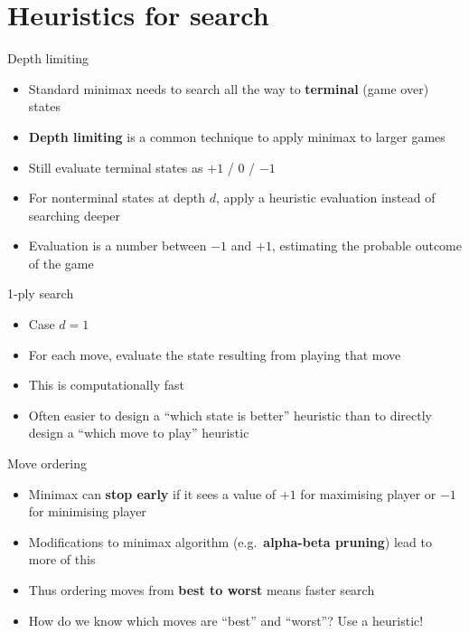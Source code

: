 \part{Heuristics for search}
\frame{\partpage}

\begin{frame}{Depth limiting}
	\begin{itemize}
		\pause\item Standard minimax needs to search all the way to \textbf{terminal} (game over) states
		\pause\item \textbf{Depth limiting} is a common technique to apply minimax to larger games
		\pause\item Still evaluate terminal states as $+1$ / $0$ / $-1$
		\pause\item For nonterminal states at depth $d$, apply a heuristic evaluation instead of searching deeper
		\pause\item Evaluation is a number between $-1$ and $+1$, estimating the probable outcome of the game
	\end{itemize}
\end{frame}

\begin{frame}{1-ply search}
	\begin{itemize}
		\pause\item Case $d=1$
		\pause\item For each move, evaluate the state resulting from playing that move
		\pause\item This is computationally fast
		\pause\item Often easier to design a ``which state is better'' heuristic than to directly design a ``which move to play'' heuristic
	\end{itemize}
\end{frame}

\begin{frame}{Move ordering}
	\begin{itemize}
		\pause\item Minimax can \textbf{stop early} if it sees a value of $+1$ for maximising player or $-1$
			for minimising player
		\pause\item Modifications to minimax algorithm (e.g.\ \textbf{alpha-beta pruning}) lead to more of this
		\pause\item Thus ordering moves from \textbf{best to worst} means faster search
		\pause\item How do we know which moves are ``best'' and ``worst''? Use a heuristic!
	\end{itemize}
\end{frame}

